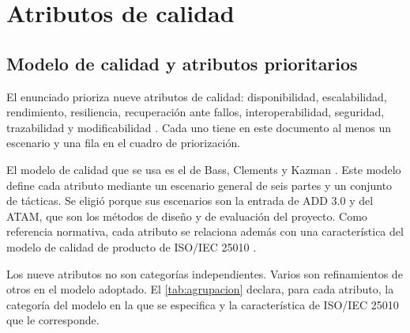 \documentclass[11pt,letterpaper]{article}
\begin{document}
\newpage
\section{Atributos de calidad}
\label{sec:calidad}

\subsection{Modelo de calidad y atributos prioritarios}
\label{sec:nueve}

El enunciado prioriza nueve atributos de calidad: disponibilidad, escalabilidad, rendimiento,
resiliencia, recuperación ante fallos, interoperabilidad, seguridad, trazabilidad y modificabilidad
\cite{enunciado}. Cada uno tiene en este documento al menos un escenario y una fila en el cuadro de
priorización.

El modelo de calidad que se usa es el de Bass, Clements y Kazman \cite{bass}. Este modelo define
cada atributo mediante un escenario general de seis partes y un conjunto de tácticas. Se eligió
porque sus escenarios son la entrada de ADD 3.0 y del ATAM, que son los métodos de diseño y de
evaluación del proyecto. Como referencia normativa, cada atributo se relaciona además con una
característica del modelo de calidad de producto de ISO/IEC 25010 \cite{iso25010}.

Los nueve atributos no son categorías independientes. Varios son refinamientos de otros en el
modelo adoptado. El \cref{tab:agrupacion} declara, para cada atributo, la categoría del modelo en la
que se especifica y la característica de ISO/IEC 25010 que le corresponde.
\end{document}
